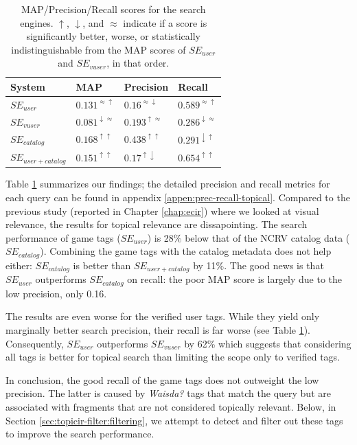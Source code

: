 \begin{table}[tb]
\centering
\begin{footnotesize}
\begin{tabular}{l|l|l|l}
\toprule
System & MAP & Precision & Recall \\
\hline
$SE_{user}$ & $0.131^{\approx \uparrow}$ & $0.16^{\approx \downarrow}$ & $0.589^{\approx \uparrow}$ \\
\hline
$SE_{vuser}$ & $0.081^{\downarrow \approx}$ & $0.193^{\uparrow \approx}$ & $0.286^{\downarrow \approx}$ \\
\hline
$SE_{catalog}$ & $0.168^{\uparrow \uparrow}$ & $0.438^{\uparrow \uparrow}$ &	$0.291^{\downarrow \uparrow}$ \\
\hline
$SE_{user+catalog}$ & $0.151^{\uparrow \uparrow}$ & $0.17^{\uparrow \downarrow}$ & $0.654^{\uparrow \uparrow}$ \\
\bottomrule
\end{tabular}
\caption{MAP/Precision/Recall scores for the search engines. $\uparrow$, $\downarrow$, and $\approx$ indicate if a score is significantly better, worse, or statistically indistinguishable from the MAP scores of $SE_{user}$ and $SE_{vuser}$, in that order.}
\label{topicir:table:map-prec-rec}
\end{footnotesize}
\end{table}

Table \ref{topicir:table:map-prec-rec} summarizes our findings; the detailed precision and recall metrics for each query can be found in appendix \ref{appen:prec-recall-topical}.
Compared to the previous study (reported in Chapter \ref{chap:ecir}) where we looked at visual relevance, the results for topical relevance are dissapointing. The search performance of game tags ($SE_{user}$) is 28\% below that of the NCRV catalog data ($SE_{catalog}$). Combining the game tags with the catalog metadata does not help either: $SE_{catalog}$ is better than $SE_{user+catalog}$ by 11\%. 
The good news is that $SE_{user}$ outperforms $SE_{catalog}$ on recall: the poor MAP score is largely due to the low precision, only 0.16.

The results are even worse for the verified user tags. While they yield only marginally better search precision, their recall is far worse (see Table \ref{topicir:table:map-prec-rec}). Consequently, $SE_{user}$ outperforms $SE_{vuser}$ by 62\% which suggests that considering all tags is better for topical search than limiting the scope only to verified tags.

In conclusion, the good recall of the game tags does not outweight the low precision. The latter is caused by \textit{Waisda?} tags that match the query but are associated with fragments that are not considered topically relevant. Below, in Section \ref{sec:topicir-filter:filtering}, we attempt to detect and filter out these tags to improve the search performance.

